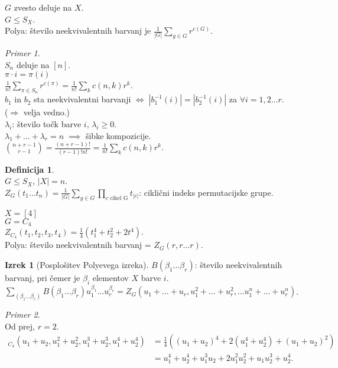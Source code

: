 \documentclass[a4paper, 12pt]{book}
\theoremstyle{definition}
\newtheorem{defn}[counter]{Definicija}
\newtheorem{theorem}[counter]{Izrek}
\theoremstyle{remark}
\newtheorem*{ex}{Primer}
\begin{document}
$G$ zvesto deluje na $X$. \\
$G \leq S_X$. \\
Polya: število neekvivalentnih barvanj je $\frac{1}{|G|} \sum_{g \in G} r^{c(G)}$.
\begin{ex} \text{} \\
  $S_n$ deluje na $[n]$. \\
  $\pi \cdot i = \pi(i)$ \\
  $\frac{1}{n!} \sum_{\pi \in S_n} r^{c(\pi)} = \frac{1}{n!} \sum_k c(n, k) r^k$. \\
  $b_1$ in $b_2$ sta neekvivalentni barvanji $\iff \; \left|b_1^{-1}(i)\right| = \left|b_2^{-1}(i)\right|$
  za $\forall i = 1, 2 \dots r$. \\
  ($\Rightarrow$ velja vedno.) \\
  $\lambda_i$: število točk barve $i$, $\lambda_i \geq 0$. \\
  $\lambda_1 + \dots + \lambda_r = n \; \implies$ šibke kompozicije. \\
  $\binom{n+r-1}{r-1} = \frac{(n+r-1)!}{(r-1)! n!} = \frac{1}{n!} \sum_k c(n, k) r^k$.
\end{ex}
\begin{defn} \text{} \\
  $G \leq S_X$, $|X| = n$. \\
  $Z_G(t_1 \dots t_n) = \frac{1}{|G|} \sum_{g \in G} \prod_{c \text{ cikel G}} t_{|c|}$:
  ciklični indeks permutacijske grupe.
\end{defn}
$X = [4]$ \\
$G = C_4$ \\
$Z_{C_4}(t_1, t_2, t_3, t_4) = \frac{1}{4} \left(t_1^4 + t_2^2 + 2 t^4\right)$. \\
Polya: število neekvivalentnih barvanj = $Z_G(r, r \dots r)$.
\begin{theorem}[Posplošitev Polyevega izreka]
  $B(\beta_1 \dots \beta_r)$: število neekvivalentnih barvanj, pri čemer je $\beta_i$ elementov $X$ barve $i$. \\
  $\sum_{(\beta_1 \dots \beta_r)} B(\beta_1 \dots \beta_r) u_1^{\beta_1} \dots u_r^{\beta_r}
  = Z_G(u_1 + \dots + u_r, u_1^2 + \dots + u_r^2, \dots u_1^n + \dots + u_r^n)$.
\end{theorem}
\begin{ex} \text{} \\
  Od prej, $r=2$.
  \begin{align*}
    _{C_4}(u_1 + u_2, u_1^2 + u_2^2, u_1^3 + u_2^3, u_1^4 + u_2^4)
    &= \frac{1}{4} \left((u_1+u_2)^4 + 2(u_1^4+u_2^4) + (u_1+u_2)^2\right) \\
    &= u_1^4 + u_2^4 + u_1^3 u_2 + 2 u_1^2 u_2^2 + u_1 u_2^3 + u_2^4.
  \end{align*}
\end{ex}
\end{document}
